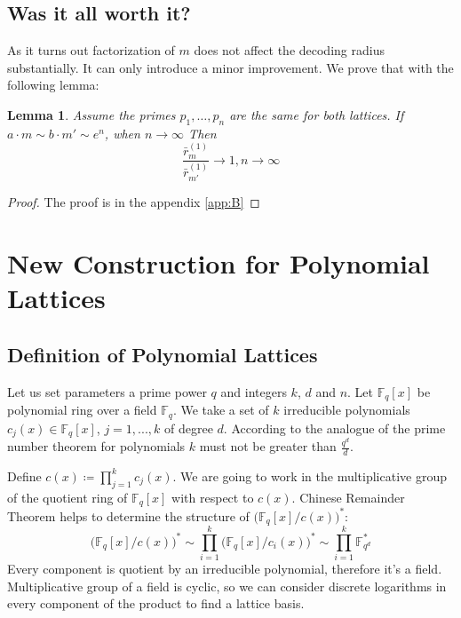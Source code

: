 \documentclass[12pt]{article}
\newcommand{\FF}{\mathbb{F}}
\newtheorem{lemma}{Lemma}
\begin{document}
\subsection{Was it all worth it?}
\label{subsec:improvement_integers}


As it turns out factorization of $m$ does not affect the decoding radius substantially. It can only introduce a minor improvement. We prove that with the following lemma:

\begin{lemma}\label{lemma:no_imrovement}
Assume the primes $p_{1}, \dots, p_{n}$ are the same for both lattices. If $a \cdot m \sim b \cdot m' \sim e^n$, when $n \rightarrow \infty$ Then
\[
    \frac{\bar r_{m}^{(1)}}{\bar r_{m'}^{(1)}} \rightarrow 1, n \rightarrow \infty
\]
\end{lemma}
\begin{proof}
    The proof is in the appendix \ref{app:B}
\end{proof}



\section{New Construction for Polynomial Lattices}
\label{sec:polynomials}



\subsection{Definition of Polynomial Lattices}
\label{subsec:def_polynomials}


Let us set parameters a prime power $q$ and integers $k$, $d$ and $n$. Let $\FF_{q}[x]$ be polynomial ring over a field  $\FF_{q}$. We take a set of $k$ irreducible polynomials $c_{j}(x) \in \FF_{q}[x]$, $j =1, ...,k$ of degree $d$. According to the analogue of the prime number theorem for polynomials $k$ must not be greater than $\frac{q^d}{d}$.

Define $c(x) \coloneqq \prod_{j = 1}^{k} c_{j}(x)$. We are going to work in the multiplicative group of the quotient ring of  $\FF_{q}[x]$ with respect to $c(x)$.
Chinese Remainder Theorem helps to determine the structure of $\big(\FF_{q}[x]/c(x)\big)^{*}$:
\[
    \big(\FF_{q}[x]/c(x)\big)^{*} \sim \prod_{i=1}^{k}\big(\FF_{q}[x]/c_{i}(x)\big)^{*} \sim \prod_{i=1}^{k}\FF_{q^{d}}^*
\]
Every component is quotient by an irreducible polynomial, therefore it's a field. Multiplicative group of a field is cyclic, so we can consider discrete logarithms in every component of the product to find a lattice basis.
\end{document}

